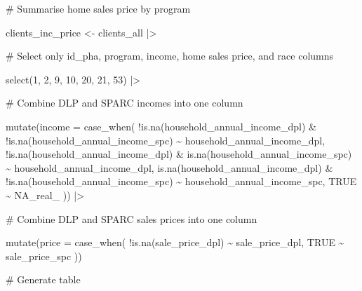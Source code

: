 \documentclass[
  letterpaper,
  DIV=11,
  numbers=noendperiod]{scrartcl}
\newenvironment{Shaded}{\begin{snugshade}}{\end{snugshade}}
\newcommand{\AttributeTok}[1]{\textcolor[rgb]{0.40,0.45,0.13}{#1}}
\newcommand{\CommentTok}[1]{\textcolor[rgb]{0.37,0.37,0.37}{#1}}
\newcommand{\ConstantTok}[1]{\textcolor[rgb]{0.56,0.35,0.01}{#1}}
\newcommand{\DecValTok}[1]{\textcolor[rgb]{0.68,0.00,0.00}{#1}}
\newcommand{\FunctionTok}[1]{\textcolor[rgb]{0.28,0.35,0.67}{#1}}
\newcommand{\NormalTok}[1]{\textcolor[rgb]{0.00,0.23,0.31}{#1}}
\newcommand{\OtherTok}[1]{\textcolor[rgb]{0.00,0.23,0.31}{#1}}
\newcommand{\SpecialCharTok}[1]{\textcolor[rgb]{0.37,0.37,0.37}{#1}}
\begin{document}
\begin{Shaded}
\begin{Highlighting}[]
\CommentTok{\# Summarise home sales price by program}

\NormalTok{clients\_inc\_price }\OtherTok{\textless{}{-}}\NormalTok{ clients\_all }\SpecialCharTok{|\textgreater{}} 

  \CommentTok{\# Select only id\_pha, program, income, home sales price, and race columns}
  
  \FunctionTok{select}\NormalTok{(}\DecValTok{1}\NormalTok{, }\DecValTok{2}\NormalTok{, }\DecValTok{9}\NormalTok{, }\DecValTok{10}\NormalTok{, }\DecValTok{20}\NormalTok{, }\DecValTok{21}\NormalTok{, }\DecValTok{53}\NormalTok{) }\SpecialCharTok{|\textgreater{}}
  
  \CommentTok{\# Combine DLP and SPARC incomes into one column}
  
  \FunctionTok{mutate}\NormalTok{(}\AttributeTok{income =} \FunctionTok{case\_when}\NormalTok{(}
    \SpecialCharTok{!}\FunctionTok{is.na}\NormalTok{(household\_annual\_income\_dpl) }\SpecialCharTok{\&} \SpecialCharTok{!}\FunctionTok{is.na}\NormalTok{(household\_annual\_income\_spc) }\SpecialCharTok{\textasciitilde{}}\NormalTok{ household\_annual\_income\_dpl,}
    \SpecialCharTok{!}\FunctionTok{is.na}\NormalTok{(household\_annual\_income\_dpl) }\SpecialCharTok{\&} \FunctionTok{is.na}\NormalTok{(household\_annual\_income\_spc) }\SpecialCharTok{\textasciitilde{}}\NormalTok{ household\_annual\_income\_dpl,}
    \FunctionTok{is.na}\NormalTok{(household\_annual\_income\_dpl) }\SpecialCharTok{\&} \SpecialCharTok{!}\FunctionTok{is.na}\NormalTok{(household\_annual\_income\_spc) }\SpecialCharTok{\textasciitilde{}}\NormalTok{ household\_annual\_income\_spc,}
    \ConstantTok{TRUE} \SpecialCharTok{\textasciitilde{}} \ConstantTok{NA\_real\_}
\NormalTok{  )) }\SpecialCharTok{|\textgreater{}} 

  \CommentTok{\# Combine DLP and SPARC sales prices into one column}
  
  \FunctionTok{mutate}\NormalTok{(}\AttributeTok{price =} \FunctionTok{case\_when}\NormalTok{(}
    \SpecialCharTok{!}\FunctionTok{is.na}\NormalTok{(sale\_price\_dpl) }\SpecialCharTok{\textasciitilde{}}\NormalTok{ sale\_price\_dpl,}
    \ConstantTok{TRUE} \SpecialCharTok{\textasciitilde{}}\NormalTok{ sale\_price\_spc}
\NormalTok{  ))}

\CommentTok{\# Generate table}


\end{Highlighting}
\end{Shaded}
\end{document}
